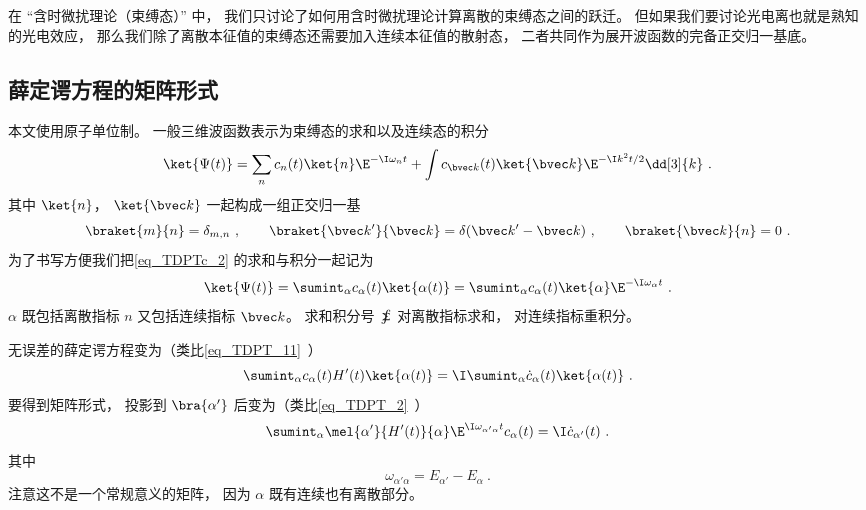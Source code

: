 

在 “含时微扰理论（束缚态）” 中， 我们只讨论了如何用含时微扰理论计算离散的束缚态之间的跃迁。 但如果我们要讨论光电离也就是熟知的光电效应， 那么我们除了离散本征值的束缚态还需要加入连续本征值的散射态， 二者共同作为展开波函数的完备正交归一基底。

\subsection{薛定谔方程的矩阵形式}
本文使用原子单位制。 一般三维波函数表示为束缚态的求和以及连续态的积分
\begin{equation}\label{eq_TDPTc_2}
\ket{\Psi(t)} = \sum_n c_n(t)\ket{n}\E^{-\I\omega_n t} + \int c_{\bvec k}(t)\ket{\bvec k}\E^{-\I k^2 t/2} \dd[3]{k}~.
\end{equation}
其中 $\ket{n}$， $\ket{\bvec k}$ 一起构成一组正交归一基
\begin{equation}
\braket{m}{n} = \delta_{m,n}~, \qquad
\braket{\bvec k'}{\bvec k} = \delta(\bvec k' - \bvec k)~, \qquad
\braket{\bvec k}{n} = 0~.
\end{equation}
为了书写方便我们把\autoref{eq_TDPTc_2} 的求和与积分一起记为
\begin{equation}
\ket{\Psi(t)} = \sumint_\alpha c_\alpha(t) \ket{\alpha(t)} = \sumint_\alpha c_\alpha(t) \ket{\alpha}\E^{-\I\omega_\alpha t} ~.
\end{equation}
$\alpha$ 既包括离散指标 $n$ 又包括连续指标 $\bvec k$。 求和积分号 $\sumint$ 对离散指标求和， 对连续指标重积分。

无误差的薛定谔方程变为（类比\autoref{eq_TDPT_11}~）
\begin{equation}
\sumint_\alpha c_\alpha(t) H'(t) \ket{\alpha(t)} = \I \sumint_\alpha \dot c_\alpha(t) \ket{\alpha(t)}~.
\end{equation}
要得到矩阵形式， 投影到 $\bra{\alpha'}$ 后变为（类比\autoref{eq_TDPT_2}~）
\begin{equation}
\sumint_\alpha \mel{\alpha'}{H'(t)}{\alpha} \E^{\I \omega_{\alpha'\alpha} t} c_\alpha(t)
= \I \dot c_{\alpha'} (t)~.
\end{equation}
其中
\begin{equation}
\omega_{\alpha'\alpha} = E_{\alpha'}-E_\alpha~.
\end{equation}
注意这不是一个常规意义的矩阵， 因为 $\alpha$ 既有连续也有离散部分。

